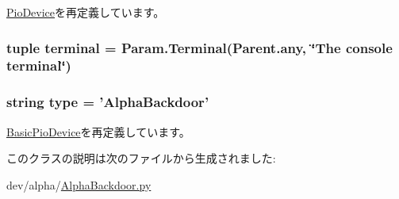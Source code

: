 \hyperlink{classDevice_1_1PioDevice_ab737471139f5a296e5b26e8a0e1b0744}{PioDevice}を再定義しています。\hypertarget{classAlphaBackdoor_1_1AlphaBackdoor_a36fbd7aa3e5bc702238c8fc439330d8f}{
\subsubsection[{terminal}]{\setlength{\rightskip}{0pt plus 5cm}tuple {\bf terminal} = Param.Terminal(Parent.any, \char`\"{}The console {\bf terminal}\char`\"{})}}
\label{classAlphaBackdoor_1_1AlphaBackdoor_a36fbd7aa3e5bc702238c8fc439330d8f}
\hypertarget{classAlphaBackdoor_1_1AlphaBackdoor_acce15679d830831b0bbe8ebc2a60b2ca}{
\subsubsection[{type}]{\setlength{\rightskip}{0pt plus 5cm}string type = '{\bf AlphaBackdoor}'}}
\label{classAlphaBackdoor_1_1AlphaBackdoor_acce15679d830831b0bbe8ebc2a60b2ca}


\hyperlink{classDevice_1_1BasicPioDevice_acce15679d830831b0bbe8ebc2a60b2ca}{BasicPioDevice}を再定義しています。

このクラスの説明は次のファイルから生成されました:\begin{DoxyCompactItemize}
\item 
dev/alpha/\hyperlink{AlphaBackdoor_8py}{AlphaBackdoor.py}\end{DoxyCompactItemize}
